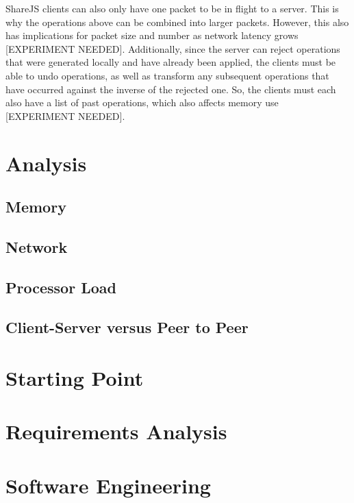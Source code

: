 \documentclass[12pt,a4paper,twoside,openright]{report}
\begin{document}
	ShareJS clients can also only have one packet to be in flight to a server. This is why the operations above can be combined into larger packets. However, this also has implications for packet size and number as network latency grows [EXPERIMENT NEEDED]. Additionally, since the server can reject operations that were generated locally and have already been applied, the clients must be able to undo operations, as well as transform any subsequent operations that have occurred against the inverse of the rejected one. So, the clients must each also have a list of past operations, which also affects memory use [EXPERIMENT NEEDED].

	
\section{Analysis}
	
	\subsection{Memory}
	
	\subsection{Network}
	
	\subsection{Processor Load}
	
	\subsection{Client-Server versus Peer to Peer}
	
\section{Starting Point}

\section{Requirements Analysis}

\section{Software Engineering}
\end{document}
